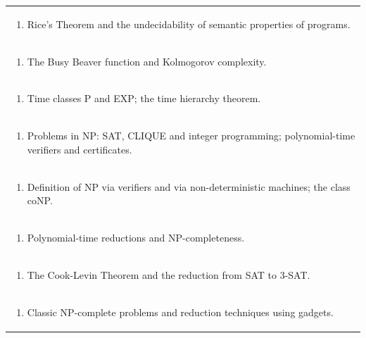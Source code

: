 \documentclass[11pt]{article}
\begin{document}
\begin{center}
\begin{longtable}{|p{4cm}|p{4cm}|p{4cm}|p{4cm}|}
\multicolumn{4}{|p{\dimexpr 16cm + 6\tabcolsep\relax}|}{\begin{enumerate}[start=9]\item Rice's Theorem and the undecidability of semantic properties of programs.\end{enumerate}}\\
\multicolumn{4}{|p{\dimexpr 16cm + 6\tabcolsep\relax}|}{\begin{enumerate}[start=10]\item The Busy Beaver function and Kolmogorov complexity.\end{enumerate}}\\
\multicolumn{4}{|p{\dimexpr 16cm + 6\tabcolsep\relax}|}{\begin{enumerate}[start=11]\item Time classes P and EXP; the time hierarchy theorem.\end{enumerate}}\\
\multicolumn{4}{|p{\dimexpr 16cm + 6\tabcolsep\relax}|}{\begin{enumerate}[start=12]\item Problems in NP: SAT, CLIQUE and integer programming; polynomial-time verifiers and certificates.\end{enumerate}}\\
\multicolumn{4}{|p{\dimexpr 16cm + 6\tabcolsep\relax}|}{\begin{enumerate}[start=13]\item Definition of NP via verifiers and via non-deterministic machines; the class coNP.\end{enumerate}}\\
\multicolumn{4}{|p{\dimexpr 16cm + 6\tabcolsep\relax}|}{\begin{enumerate}[start=14]\item Polynomial-time reductions and NP-completeness.\end{enumerate}}\\
\multicolumn{4}{|p{\dimexpr 16cm + 6\tabcolsep\relax}|}{\begin{enumerate}[start=15]\item The Cook-Levin Theorem and the reduction from SAT to 3-SAT.\end{enumerate}}\\
\multicolumn{4}{|p{\dimexpr 16cm + 6\tabcolsep\relax}|}{\begin{enumerate}[start=16]\item Classic NP-complete problems and reduction techniques using gadgets.\end{enumerate}}\\

\end{longtable}
\end{center}
\end{document}
